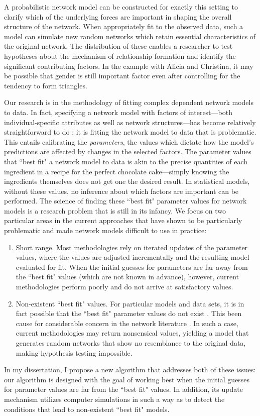 \documentclass[12pt]{article}
\begin{document}
A probabilistic network model can be constructed for exactly this setting
to clarify which of the underlying forces are important in shaping the 
overall structure of the network.  
When appropriately fit to the observed data, such a model can 
simulate new random networks which retain essential characteristics of 
the original network.  The distribution of these enables a researcher to 
test hypotheses about the mechanism of relationship formation and identify the
significant contributing factors.  In the example with Alicia and Christina, it 
may be possible that gender is still important factor even after controlling
for the tendency to form triangles.

Our research is in the methodology of fitting complex dependent network models to data.  
In fact, specifying a network model with factors of interest---both 
individual-specific attributes as well as network structures---has become 
relatively straightforward to do \citep{Wasserman:1996}; it is fitting
the network model to data that is problematic.  This entails calibrating 
the \emph{parameters}, the values which dictate how the model's predictions 
are affected by changes in the selected factors.  
The parameter values that ``best fit" a network model to data is akin
 to the precise quantities of each ingredient in a recipe for the perfect 
 chocolate cake---simply knowing the ingredients themselves does not get one the
 desired result.  In statistical models, without these values,
 no inference about which factors are important can be performed.
The science of finding these ``best fit" parameter values for network models 
is a research problem that is still in its infancy.  
We focus on two particular areas in the current approaches that have shown to be 
particularly problematic and made network models difficult to use in practice:
\begin{enumerate}
\item Short range.  Most methodologies rely on iterated updates of the parameter
values, where the values are adjusted incrementally and the resulting model evaluated 
for fit.  When the initial guesses for parameters are far away from the 
``best fit" values (which are not known in advance), however, current 
methodologies perform poorly and do not arrive at satisfactory values.
\item Non-existent ``best fit" values.  For particular models and data sets, it is 
in fact possible that the ``best fit" parameter values do not exist \citep{Handcock:degeneracy,Rinaldo:2009}.  
This been cause for considerable concern in the network literature 
\citep{advancesp*,recentp*,statnet-tutorial}.  In such a case, current 
methodologies may return nonsensical values, yielding a model that generates 
random networks that show no resemblance to the original data, making hypothesis
testing impossible.
\end{enumerate}
In my dissertation, I propose a new algorithm that addresses both of these 
issues: our algorithm is designed with the goal of working best when the initial 
guesses for parameter values are far from the ``best fit" values.  In addition, its 
update mechanism utilizes computer simulations in such a way as 
to detect the conditions that lead to non-existent ``best fit" models.
\end{document}
